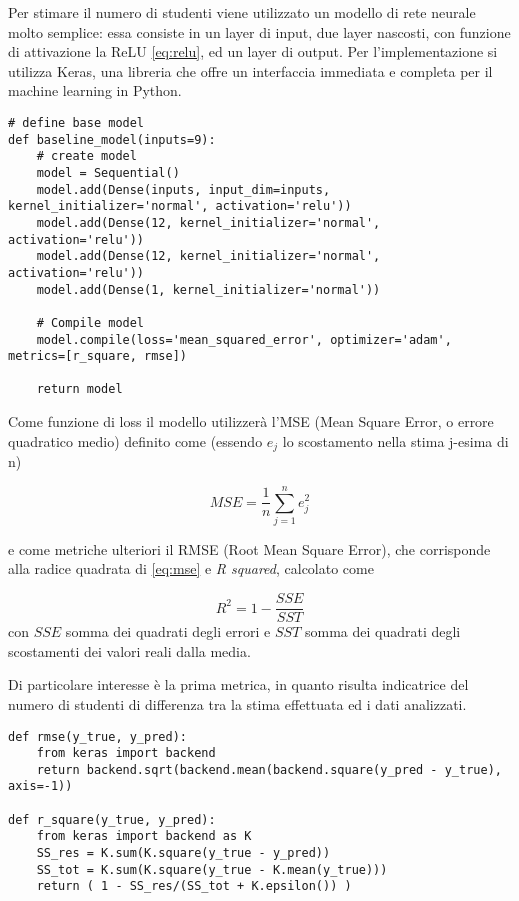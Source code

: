 Per stimare il numero di studenti viene utilizzato un modello di rete neurale molto semplice:
essa consiste in un layer di input, due layer nascosti, con funzione di 
attivazione la ReLU \ref{eq:relu}, ed un layer di output.
Per l'implementazione si utilizza Keras, una libreria che offre un interfaccia 
immediata e completa per il machine learning in Python.

\begin{verbatim}
# define base model
def baseline_model(inputs=9):
    # create model
    model = Sequential()
    model.add(Dense(inputs, input_dim=inputs, kernel_initializer='normal', activation='relu'))
    model.add(Dense(12, kernel_initializer='normal', activation='relu'))
    model.add(Dense(12, kernel_initializer='normal', activation='relu'))
    model.add(Dense(1, kernel_initializer='normal'))

    # Compile model
    model.compile(loss='mean_squared_error', optimizer='adam', metrics=[r_square, rmse])

    return model
\end{verbatim} 

Come funzione di loss il modello utilizzerà l'MSE (Mean Square Error, o errore quadratico medio) 
definito come (essendo $e_j$ lo scostamento nella stima j-esima di n)\cite{Botchkarev2018}

\begin{equation}
    MSE = \frac{1}{n} \sum_{j=1}^{n} e_j^2
    \label{eq:mse}
\end{equation}

e come metriche ulteriori il RMSE (Root Mean Square Error), che corrisponde alla radice quadrata 
di \ref{eq:mse} e \textit{R squared}, calcolato come \cite{RePEc:pra:mprapa:84722}

\begin{equation}
    R^2 = 1 - \frac{SSE}{SST}
    \label{eq:r2}
\end{equation}
\noindent
con $SSE$ somma dei quadrati degli errori e $SST$ somma dei quadrati degli scostamenti dei valori 
reali dalla media.

Di particolare interesse è la prima metrica, in quanto risulta indicatrice del numero di studenti 
di differenza tra la stima effettuata ed i dati analizzati.

\begin{verbatim}
def rmse(y_true, y_pred):
    from keras import backend
    return backend.sqrt(backend.mean(backend.square(y_pred - y_true), axis=-1))

def r_square(y_true, y_pred):
    from keras import backend as K
    SS_res = K.sum(K.square(y_true - y_pred))
    SS_tot = K.sum(K.square(y_true - K.mean(y_true)))
    return ( 1 - SS_res/(SS_tot + K.epsilon()) )
\end{verbatim} 

